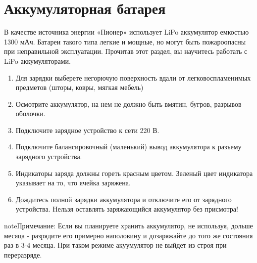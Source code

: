 \documentclass[a4paper,10pt,russian]{sphinxmanual}
\begin{document}
\section{Аккумуляторная батарея}
\label{\detokenize{flight/operation_lipo:id1}}\label{\detokenize{flight/operation_lipo::doc}}

В качестве источника энергии «Пионер» использует LiPo аккумулятор емкостью 1300 мАч. Батареи такого типа легкие и мощные, но могут быть пожароопасны при неправильной эксплуатации. Прочитав этот раздел, вы научитесь работать с LiPo аккумуляторами.

\begin{enumerate}
\def\theenumi{\arabic{enumi}}
\def\labelenumi{\theenumi .}
\makeatletter\def\p@enumii{\p@enumi \theenumi .}\makeatother
\item {} 
Для зарядки выберете негорючую поверхность вдали от легковоспламенимых предметов (шторы, ковры, мягкая мебель)

\item {} 
Осмотрите аккумулятор, на нем не должно быть вмятин, бугров, разрывов оболочки.

\item {} 
Подключите зарядное устройство к сети 220 В.

\item {} 
Подключите балансировочный (маленький) вывод аккумулятора к разъему зарядного устройства.

\item {} 
Индикаторы заряда должны гореть красным цветом. Зеленый цвет индикатора указывает на то, что ячейка заряжена.

\item {} 
Дождитесь полной зарядки аккумулятора и отключите его от зарядного устройства. Нельзя оставлять заряжающийся аккумулятор без присмотра!

\end{enumerate}

\begin{sphinxadmonition}{note}{Примечание:}
Если вы планируете хранить аккумулятор, не используя, дольше месяца - разрядите его примерно наполовину и дозаряжайте до того же состояния раз в 3-4 месяца. При таком режиме акуумулятор не выйдет из строя при переразряде.
\end{sphinxadmonition}
\end{document}
